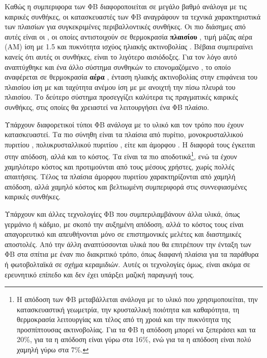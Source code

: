 \documentclass[12pt]{report}
\begin{document}
Καθώς η συμπεριφορα των ΦΒ διαφοροποιείται σε μεγάλο βαθμό ανάλογα με τις καιρικές συνθήκες, οι κατασκευαστές των ΦΒ αναγράφουν τα τεχνικά χαρακτηριστικά των πλαισίων για συγκεκριμένες περιβαλλοντικές συνθήκες. Οι πιο διάσημες
από αυτές είναι οι {}, οι οποίες αντιστοιχούν σε θερμοκρασία \textbf{πλαισίου} {}, τιμή μάζας αέρα (ΑΜ) ίση με 1.5 και πυκνότητα ισχύος ηλιακής ακτινοβολίας 
{}. Βέβαια συμπεραίνει κανείς ότι αυτές οι συνθήκες, είναι το λιγότερο αισιόδοξες. Για τον λόγο αυτό αναπτύχθηκε και ένα άλλο σύστημα συνθηκών το επονομαζόμενο 
{}, το οποίο αναφέρεται σε θερμοκρασία \textbf{αέρα} {}, ένταση ηλιακής ακτινοβολίας στην επιφάνεια του πλαισίου ίση με {} 
και ταχύτητα ανέμου ίση με {} με ανοιχτή την πίσω πλευρά του πλαισίου. Το δεύτερο σύστημα προσεγγίζει καλύτερα τις πραγματικές καιρικές συνθήκες, στις οποίες θα χρειαστεί να λειτουργήσει ένα ΦΒ πλαίσιο. 

Υπάρχουν διαφορετικοί τύποι ΦΒ ανάλογα με το υλικό και τον τρόπο που έχουν κατασκευαστεί. Τα πιο σύνηθη είναι τα πλαίσια από πυρίτιο, μονοκρυσταλλικού πυριτίου {}, πολυκρυσταλλικού πυριτίου {}, 
είτε και άμορφου {}. Η διαφορά τους έγκειται στην απόδοση, αλλά και το κόστος. Τα {} είναι τα πιο αποδοτικά\footnote{Η απόδοση των ΦΒ μεταβάλλεται ανάλογα με το υλικό που χρησιμοποιείται, την
κατασκευαστική γεωμετρία, την κρυσταλλική ποιότητα και καθαρότητα, τη θερμοκρασία λειτουργίας και τέλος από τη χροιά και την πυκνότητα της προσπίπτουσας ακτινοβολίας. Για τα {}
ΦΒ η απόδοση μπορεί να ξεπεράσει και τα 20\%, για τα {} η απόδοση είναι γύρω στα 16\%, ενώ για τα {} η απόδοση είναι πολύ χαμηλή γύρω στα 7\%.}, ενώ τα {} έχουν χαμηλότερο
κόστος και προτιμούνται από τους μέσους χρήστες, χωρίς πολλές απαιτήσεις. Τέλος τα πλαίσια άμορφου πυριτίου χαρακτηρίζονται από χαμηλή απόδοση, αλλά χαμηλό κόστος και βελτιωμένη συμπεριφορά στις συννεφιασμένες καιρικές συνθήκες.

Υπάρχουν και άλλες τεχνολογίες ΦΒ που συμπεριλαμβάνουν άλλα υλικά, όπως γερμάνιο ή κάδμιο, με σκοπό την αυξημένη απόδοση, αλλά το κόστος τους είναι απαγορευτικό και απευθήνονται μόνο σε επιστημονικές μελέτες και διαστημικές
αποστολές. Από την άλλη αναπτύσσονται υλικά που θα επιτρέπουν την ένταξη των ΦΒ στα σπίτια με έναν πιο διακριτικό τρόπο, όπως διαφανή πλαίσια για τα παράθυρα ή φωτοβολταϊκά σε σχήμα κεραμιδιών. Αυτές οι τεχνολογίες όμως, είναι
ακόμα σε ερευνητικό επίπεδο και δεν έχει υπάρξει μαζική παραγωγή τους.
\end{document}
